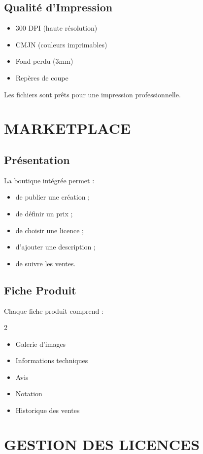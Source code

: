 \documentclass[12pt,a4paper,oneside]{book}
\begin{document}
\section{Qualité d'Impression}
\begin{itemize}
\item 300 DPI (haute résolution)
\item CMJN (couleurs imprimables)
\item Fond perdu (3mm)
\item Repères de coupe
\end{itemize}

Les fichiers sont prêts pour une impression professionnelle.

\chapter{MARKETPLACE}

\section{Présentation}
La boutique intégrée permet :
\begin{itemize}
\item de publier une création ;
\item de définir un prix ;
\item de choisir une licence ;
\item d'ajouter une description ;
\item de suivre les ventes.
\end{itemize}

\section{Fiche Produit}
Chaque fiche produit comprend :
\begin{multicols}{2}
\begin{itemize}
\item Galerie d'images
\item Informations techniques
\item Avis
\item Notation
\item Historique des ventes
\end{itemize}
\end{multicols}

\chapter{GESTION DES LICENCES}
\end{document}
